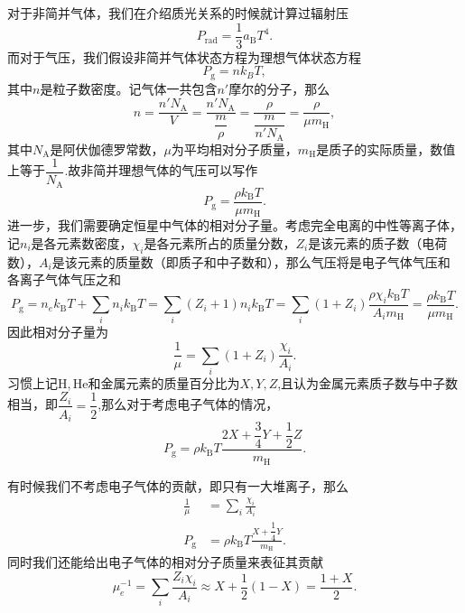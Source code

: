 \documentclass[../天体物理基础.tex]{subfiles}
\begin{document}
对于非简并气体，我们在介绍质光关系的时候就计算过辐射压
\begin{equation}
P_{\text{rad}}=\frac{1}{3}a_{\text{B}}T^{4}.
\end{equation}
而对于气压，我们假设非简并气体状态方程为理想气体状态方程
\begin{equation}
P_{\text{g}}=nk_{B}T,
\end{equation}
其中$n$是粒子数密度。记气体一共包含$n'$摩尔的分子，那么
\begin{equation}
n=\frac{n'N_{\text{A}}}{V}=\frac{n'N_{\text{A}}}{\dfrac{m}{\rho}}=\frac{\rho}{\dfrac{m}{n'N_{\text{A}}}}=\frac{\rho}{\mu m_{\mathrm{H}}},
\end{equation}
其中$N_{\text{A}}$是阿伏伽德罗常数，$\mu$为平均相对分子质量，$m_{\mathrm{H}}$是质子的实际质量，数值上等于$\dfrac{1}{N_{\text{A}}}$.故非简并理想气体的气压可以写作
\begin{equation}
P_{\text{g}}=\frac{\rho k_{\text{B}}T}{\mu m_{\mathrm{H}}}.
\end{equation}
进一步，我们需要确定恒星中气体的相对分子量。考虑完全电离的中性等离子体，记$n_{i}$是各元素数密度，$\chi_{i}$是各元素所占的质量分数，$Z_{i}$是该元素的质子数（电荷数），$A_{i}$是该元素的质量数（即质子和中子数和），那么气压将是电子气体气压和各离子气体气压之和
\begin{equation}
P_{\text{g}}=n_{e}k_{\text{B}}T+\sum_{i}n_{i}k_{\text{B}}T=\sum_{i}\left(Z_{i}+1\right)n_{i}k_{\text{B}}T=\sum_{i}\left(1+Z_{i}\right)\frac{\rho\chi_{i}k_{\text{B}}T}{A_{i}m_{\mathrm{H}}}=\frac{\rho k_{\text{B}}T}{\mu m_{\mathrm{H}}}.
\end{equation}
因此相对分子量为
\begin{equation}
\frac{1}{\mu}=\sum_{i}\left(1+Z_{i}\right)\frac{\chi_{i}}{A_{i}}.
\end{equation}
习惯上记$\mathrm{H},\mathrm{He}$和金属元素的质量百分比为$X,Y,Z$,且认为金属元素质子数与中子数相当，即$\dfrac{Z_{i}}{A_{i}}=\dfrac{1}{2}$,那么对于考虑电子气体的情况，
\begin{equation}
P_{\text{g}}=\rho k_{\text{B}}T\frac{2X+\dfrac{3}{4}Y+\dfrac{1}{2}Z}{m_{\mathrm{H}}}.
\end{equation}

有时候我们不考虑电子气体的贡献，即只有一大堆离子，那么
\begin{align}
\frac{1}{\mu}&=\sum_{i}\frac{\chi_{i}}{A_{i}}\\
P_{\text{g}}&=\rho k_{\text{B}}T\frac{X+\dfrac{1}{4}Y}{m_{\mathrm{H}}}.
\end{align}
同时我们还能给出电子气体的相对分子质量来表征其贡献
\begin{equation}
\mu_{e}^{-1}=\sum_{i}\frac{Z_{i}\chi_{i}}{A_{i}}\approx X+\frac{1}{2}(1-X)=\frac{1+X}{2}.
\end{equation}
\end{document}
